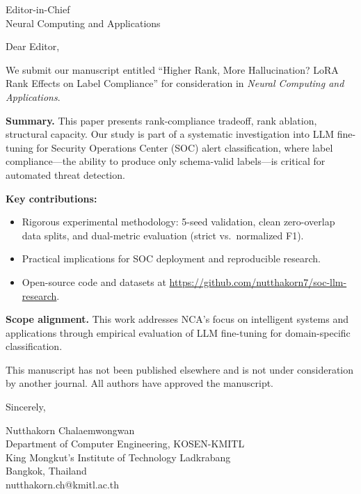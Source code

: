 \documentclass[11pt]{letter}
\begin{document}
\begin{letter}{Editor-in-Chief \\ Neural Computing and Applications}

\opening{Dear Editor,}

We submit our manuscript entitled ``Higher Rank, More Hallucination? LoRA Rank Effects on Label Compliance'' for consideration in \textit{Neural Computing and Applications}.

\textbf{Summary.} This paper presents rank-compliance tradeoff, rank ablation, structural capacity. Our study is part of a systematic investigation into LLM fine-tuning for Security Operations Center (SOC) alert classification, where label compliance---the ability to produce only schema-valid labels---is critical for automated threat detection.

\textbf{Key contributions:}
\begin{itemize}
\item Rigorous experimental methodology: 5-seed validation, clean zero-overlap data splits, and dual-metric evaluation (strict vs.\ normalized F1).
\item Practical implications for SOC deployment and reproducible research.
\item Open-source code and datasets at \url{https://github.com/nutthakorn7/soc-llm-research}.
\end{itemize}

\textbf{Scope alignment.} This work addresses NCA's focus on intelligent systems and applications through empirical evaluation of LLM fine-tuning for domain-specific classification.

This manuscript has not been published elsewhere and is not under consideration by another journal. All authors have approved the manuscript.

\closing{Sincerely,}

Nutthakorn Chalaemwongwan \\
Department of Computer Engineering, KOSEN-KMITL \\
King Mongkut's Institute of Technology Ladkrabang \\
Bangkok, Thailand \\
nutthakorn.ch@kmitl.ac.th

\end{letter}
\end{document}
